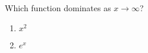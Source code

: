 
\bigskip

\item Which function dominates as $x \rightarrow \infty$?
	
	\begin{enumerate}
		\item $x^2$
		\item $e^x$
	\end{enumerate}
	

